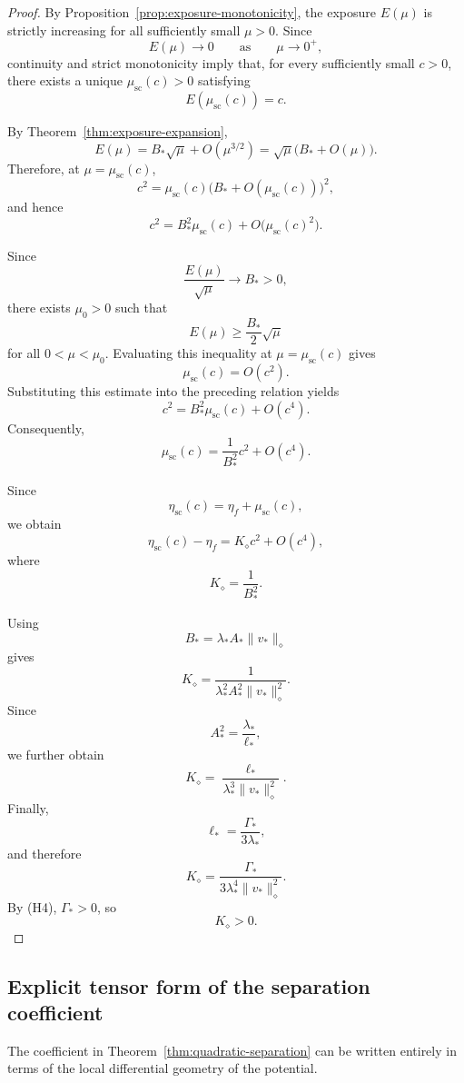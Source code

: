 \begin{proof}
By Proposition~\ref{prop:exposure-monotonicity}, the exposure
$E(\mu)$ is strictly increasing for all sufficiently small
$\mu>0$. Since
\[
E(\mu)\to0
\qquad\text{as}\qquad
\mu\to0^+,
\]
continuity and strict monotonicity imply that, for every
sufficiently small $c>0$, there exists a unique
$\mu_{\mathrm{sc}}(c)>0$ satisfying
\[
E(\mu_{\mathrm{sc}}(c))=c.
\]

By Theorem~\ref{thm:exposure-expansion},
\[
E(\mu)
=
B_*\sqrt{\mu}
+
O(\mu^{3/2})
=
\sqrt{\mu}\bigl(B_*+O(\mu)\bigr).
\]
Therefore, at $\mu=\mu_{\mathrm{sc}}(c)$,
\[
c^2
=
\mu_{\mathrm{sc}}(c)
\bigl(B_*+O(\mu_{\mathrm{sc}}(c))\bigr)^2,
\]
and hence
\[
c^2
=
B_*^2\mu_{\mathrm{sc}}(c)
+
O\bigl(\mu_{\mathrm{sc}}(c)^2\bigr).
\]

Since
\[
\frac{E(\mu)}{\sqrt{\mu}}
\to B_*>0,
\]
there exists $\mu_0>0$ such that
\[
E(\mu)\geq\frac{B_*}{2}\sqrt{\mu}
\]
for all $0<\mu<\mu_0$.
Evaluating this inequality at
$\mu=\mu_{\mathrm{sc}}(c)$ gives
\[
\mu_{\mathrm{sc}}(c)=O(c^2).
\]
Substituting this estimate into the preceding relation yields
\[
c^2
=
B_*^2\mu_{\mathrm{sc}}(c)
+
O(c^4).
\]
Consequently,
\[
\mu_{\mathrm{sc}}(c)
=
\frac{1}{B_*^2}c^2
+
O(c^4).
\]

Since
\[
\eta_{\mathrm{sc}}(c)
=
\eta_f+\mu_{\mathrm{sc}}(c),
\]
we obtain
\[
\eta_{\mathrm{sc}}(c)-\eta_f
=
K_\diamond c^2+O(c^4),
\]
where
\[
K_\diamond=\frac{1}{B_*^2}.
\]

Using
\[
B_*=\lambda_*A_*\|v_*\|_\diamond
\]
gives
\[
K_\diamond
=
\frac{1}
{\lambda_*^2A_*^2\|v_*\|_\diamond^2}.
\]
Since
\[
A_*^2=\frac{\lambda_*}{\ell_*},
\]
we further obtain
\[
K_\diamond
=
\frac{\ell_*}
{\lambda_*^3\|v_*\|_\diamond^2}.
\]
Finally,
\[
\ell_*=\frac{\Gamma_*}{3\lambda_*},
\]
and therefore
\[
K_\diamond
=
\frac{\Gamma_*}
{3\lambda_*^4\|v_*\|_\diamond^2}.
\]
By {\rm (H4)}, $\Gamma_*>0$, so
\[
K_\diamond>0.
\]
\end{proof}

\subsection{Explicit tensor form of the separation coefficient}
\label{subsec:explicit-K}

The coefficient in
Theorem~\ref{thm:quadratic-separation} can be written entirely in
terms of the local differential geometry of the potential.

